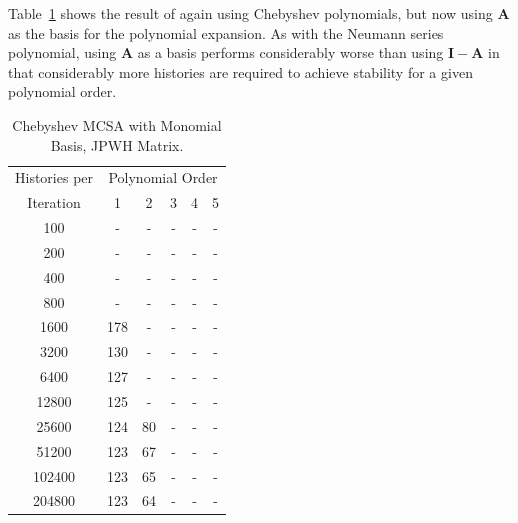 \documentclass[10pt]{article}
\newcommand{\bA}{\ensuremath{\mathbf{A}}}
\newcommand{\bI}{\ensuremath{\mathbf{I}}}
\begin{document}
Table~\ref{tab:jpwh_cheby_power} shows the result of
again using Chebyshev polynomials, but now using
$\bA$ as the basis for the polynomial expansion.
As with the Neumann series polynomial, using
$\bA$ as a basis performs considerably worse than
using $\bI - \bA$ in that considerably more histories
are required to achieve stability for a given polynomial
order.
\begin{table}
\caption{Chebyshev MCSA with Monomial Basis, JPWH Matrix.
\label{tab:jpwh_cheby_power}}
\centering
\begin{tabular}{cccccc}
 \toprule
 Histories per & \multicolumn{5}{c}{Polynomial Order} \\
 Iteration & 1 & 2 & 3 & 4 & 5 \\
 \midrule
 100 & - & - & - & - & - \\
 200 & - & - & - & - & - \\
 400 & - & - & - & - & - \\
 800 & - & - & - & - & - \\
 1600 & 178 & - & - & - & - \\
 3200 & 130 & - & - & - & - \\
 6400 & 127 & - & - & - & - \\
 12800 & 125 & - & - & - & - \\
 25600 & 124 & 80 & - & - & - \\
 51200 & 123 & 67 & - & - & - \\
 102400 & 123 & 65 & - & - & - \\
 204800 & 123 & 64 & - & - & - \\
\bottomrule
\end{tabular}
\end{table}



\end{document}
